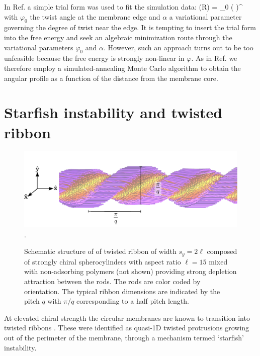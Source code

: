 In Ref. \cite{kuhnhold2022colloidal} a simple trial form was used to fit the simulation data:
\beq
\varphi(R) = \varphi_{0} \left (  \right )^{\alpha} 
\eeq
with $\varphi_{0}$ the twist angle at the membrane edge and $\alpha $ a variational parameter governing the degree of twist near the edge.  It is tempting to insert the trial form into the free energy  and seek an algebraic minimization route through the variational parameters $\varphi_{0}$ and $\alpha$.   However, such an approach turns out to be too unfeasible because the free energy is strongly non-linear in $\varphi$.  As in Ref. \cite{wensink2018elastic} we therefore employ a simulated-annealing Monte Carlo algorithm to obtain the angular profile as a function of the distance from the membrane core. 

\section{Starfish instability and twisted ribbon}


\begin{figure}
\begin{center}
\includegraphics[width= \columnwidth]{figures/chapter-5/ribbon_sketch}.
\caption{ \label{ribsnap} Schematic structure of of twisted ribbon of width $s_y=2\ell$ composed of strongly chiral spherocylinders with aspect ratio $\ell = 15$ mixed with non-adsorbing polymers (not shown) providing strong depletion attraction between the rods. The rods are color coded by orientation. The typical  ribbon dimensions are indicated by the pitch $q$ with $\pi/q$ corresponding to a half pitch length.  }
\end{center}
\end{figure}

At elevated chiral strength the circular membranes are known to transition into twisted ribbons \cite{Gibaud2012}. These were identified as quasi-1D twisted protrusions growing out of the perimeter of the membrane, through a mechanism termed `starfish' instability.


